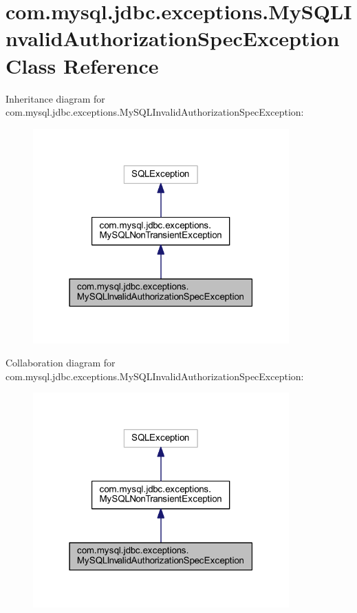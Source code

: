 \hypertarget{classcom_1_1mysql_1_1jdbc_1_1exceptions_1_1_my_s_q_l_invalid_authorization_spec_exception}{}\section{com.\+mysql.\+jdbc.\+exceptions.\+My\+S\+Q\+L\+Invalid\+Authorization\+Spec\+Exception Class Reference}
\label{classcom_1_1mysql_1_1jdbc_1_1exceptions_1_1_my_s_q_l_invalid_authorization_spec_exception}


Inheritance diagram for com.\+mysql.\+jdbc.\+exceptions.\+My\+S\+Q\+L\+Invalid\+Authorization\+Spec\+Exception\+:
\nopagebreak
\begin{figure}[H]
\begin{center}
\leavevmode
\includegraphics[width=279pt]{classcom_1_1mysql_1_1jdbc_1_1exceptions_1_1_my_s_q_l_invalid_authorization_spec_exception__inherit__graph}
\end{center}
\end{figure}


Collaboration diagram for com.\+mysql.\+jdbc.\+exceptions.\+My\+S\+Q\+L\+Invalid\+Authorization\+Spec\+Exception\+:
\nopagebreak
\begin{figure}[H]
\begin{center}
\leavevmode
\includegraphics[width=279pt]{classcom_1_1mysql_1_1jdbc_1_1exceptions_1_1_my_s_q_l_invalid_authorization_spec_exception__coll__graph}
\end{center}
\end{figure}
